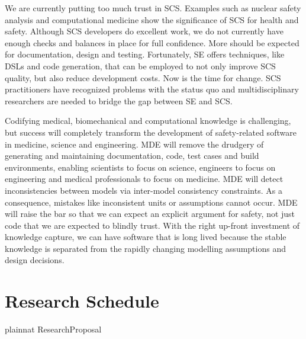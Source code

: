 \documentclass[12pt]{article}
\begin{document}
We are currently putting too much trust in SCS.  Examples such as nuclear safety
analysis and computational medicine show the significance of SCS for health and
safety.  Although SCS developers do excellent work, we do not currently have
enough checks and balances in place for full confidence.  More should be
expected for documentation, design and testing.  Fortunately, SE offers
techniques, like DSLs and code generation, that can be employed to not only
improve SCS quality, but also reduce development costs.  Now is the time for
change.  SCS practitioners have recognized problems with the status quo and
multidisciplinary researchers are needed to bridge the gap between SE and SCS.

Codifying medical, biomechanical and computational knowledge is challenging, but
success will completely transform the development of safety-related software in
medicine, science and engineering.  MDE will remove the drudgery of generating
and maintaining documentation, code, test cases and build environments, enabling
scientists to focus on science, engineers to focus on engineering and medical
professionals to focus on medicine.  MDE will detect inconsistencies between
models via inter-model consistency constraints.  As a consequence, mistakes like
inconsistent units or assumptions cannot occur.  MDE will raise the bar so that
we can expect an explicit argument for safety, not just code that we are
expected to blindly trust.  With the right up-front investment of knowledge
capture, we can have software that is long lived because the stable knowledge is
separated from the rapidly changing modelling assumptions and design decisions.

\section{Research Schedule} \label{SecSchedule}

\newpage

 {plainnat}
 {ResearchProposal}
\end{document}
